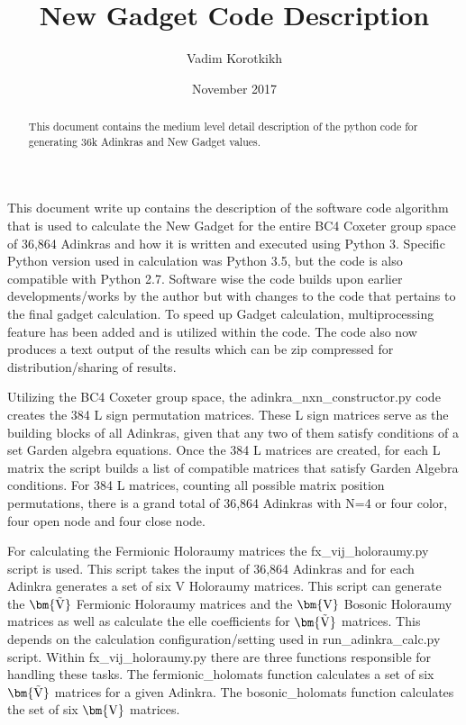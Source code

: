 \documentclass[12pt, letterpaper]{article}
\title{New Gadget Code Description}
\author{Vadim Korotkikh}
\date{November 2017}
\def\brV{{\bm {\rm V}}}
\def\brtV{{\bm{\tilde{\rm V}}}}
\begin{document}
\maketitle

\begin{abstract}
This document contains the medium level detail description of the python code
for generating 36k Adinkras and New Gadget values.
\end{abstract}

This document write up contains the description of the software code algorithm
that is used to calculate the New Gadget for the entire BC4 Coxeter group space
of 36,864 Adinkras and how it is written and executed using Python 3.
Specific Python version used in calculation was Python 3.5, but the code is also
compatible with Python 2.7.
Software wise the code builds upon earlier developments/works by the author but
with changes to the code that pertains to the final gadget calculation.
To speed up Gadget calculation, multiprocessing feature has been added and is
utilized within the code. The code also now produces a text output of the
results which can be zip compressed for distribution/sharing of results.\par
Utilizing the BC4 Coxeter group space, the adinkra{\_}nxn{\_}constructor.py
code creates the 384 L sign permutation matrices. These L sign matrices serve as the building
blocks of all Adinkras, given that any two of them satisfy conditions of a set Garden algebra
equations. Once the 384 L matrices are created, for each L matrix the script builds a list of
compatible matrices that satisfy Garden Algebra conditions. For 384 L matrices, counting all
possible matrix position permutations, there is a grand total of 36,864 Adinkras with N=4 or
four color, four open node and four close node.\par
For calculating the Fermionic Holoraumy matrices the
fx{\_}vij{\_}holoraumy.py script is used.
This script takes the input of 36,864 Adinkras and for each Adinkra generates a set of six
V Holoraumy matrices. This script can generate the $\brtV$ Fermionic Holoraumy matrices and the
$\brV$ Bosonic Holoraumy matrices as well as calculate the elle coefficients for $\brtV$ matrices.
This depends on the calculation configuration/setting used in run{\_}adinkra{\_}calc.py
script. Within fx{\_}vij{\_}holoraumy.py there are three functions responsible for handling these tasks.
The fermionic{\_}holomats function calculates a set of six $\brtV$ matrices for a
given Adinkra. The bosonic{\_}holomats function calculates the set of six $\brV$ matrices.
\end{document}
